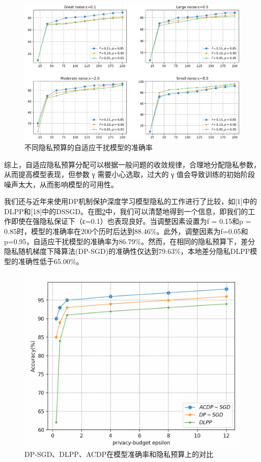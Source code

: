 \begin{figure}[!hbt]
\centering
  	\includegraphics[scale=0.4]{fig2/C5/自适应干扰实验}%
	\caption{不同隐私预算的自适应干扰模型的准确率}
  	\label{fig:不同隐私预算的自适应干扰机制在MINIST数据集上的准确率} 
\end{figure}

综上，自适应隐私预算分配可以根据一般问题的收敛规律，合理地分配隐私参数，从而提高模型表现，但参数 γ 需要小心选取，过大的 γ 值会导致训练的初始阶段噪声太大，从而影响模型的可用性。

我们还与近年来使用DP机制保护深度学习模型隐私的工作进行了比较，如[1]中的DLPP和[18]中的DSSGD。在图\ref{fig:DP-SGD、DLPP、ACDP在模型准确率和隐私预算上的对比}中，我们可以清楚地得到一个信息，即我们的工作即使在强隐私保证下（ε=0.1）也表现良好。当调整因素设置为f = 0.15和p = 0.85时，模型的准确率在200个历时后达到88.46$\%$。此外，调整因素为f=0.05和p=0.95，自适应干扰模型的准确率为86.79$\%$。然而，在相同的隐私预算下，差分隐私随机梯度下降算法(DP-SGD)的准确性仅达到79.63$\%$，本地差分隐私DLPP模型的准确性低于65.00$\%$。

\begin{figure}[!hbt]
\centering
  	\includegraphics[scale=0.4]{fig2/C5/自适应干扰实验对比}%
	\caption{DP-SGD、DLPP、ACDP在模型准确率和隐私预算上的对比}
  	\label{fig:DP-SGD、DLPP、ACDP在模型准确率和隐私预算上的对比} 
\end{figure}


